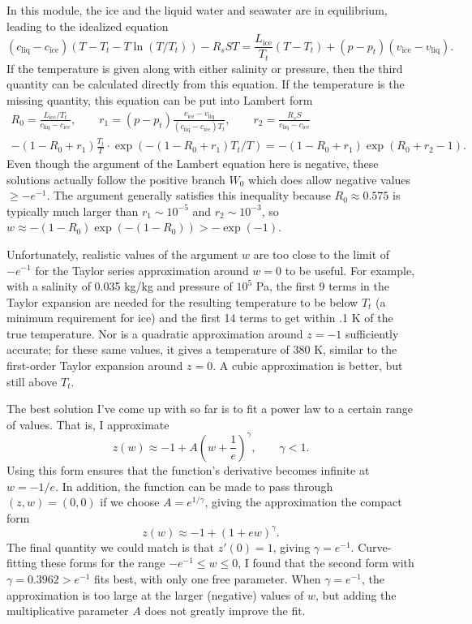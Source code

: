 \documentclass{article}
\newcommand{\liq}{\text{liq}}
\newcommand{\ice}{\text{ice}}
\begin{document}
In this module, the ice and the liquid water and seawater are in equilibrium, leading to the idealized equation
\begin{equation*}
    (c_{\liq}-c_{\ice}) (T - T_t - T \ln(T/T_t)) - R_s S T = \frac{L_{\ice}}{T_t} (T - T_t) + (p - p_t) (v_{\ice} - v_{\liq}).
\end{equation*}
If the temperature is given along with either salinity or pressure, then the third quantity can be calculated directly from this equation. If the temperature is the missing quantity, this equation can be put into Lambert form
\begin{gather*}
    R_0 = \frac{L_{\ice}/T_t}{c_{\liq}-c_{\ice}}, \qquad r_1 = (p - p_t) \frac{v_{\ice}-v_{\liq}}{(c_{\liq}-c_{\ice}) T_t}, \qquad r_2 = \frac{R_s S}{c_{\liq}-c_{\ice}} \\
    -(1 - R_0 + r_1) \frac{T_t}{T} \cdot \exp(-(1 - R_0 + r_1) T_t/T) = -(1 - R_0 + r_1) \exp(R_0 + r_2 - 1).
\end{gather*}
Even though the argument of the Lambert equation here is negative, these solutions actually follow the positive branch $W_0$ which does allow negative values $\ge -e^{-1}$. The argument generally satisfies this inequality because $R_0 \approx 0.575$ is typically much larger than $r_1 \sim 10^{-5}$ and $r_2 \sim 10^{-3}$, so $w \approx -(1-R_0)\exp(-(1-R_0)) > -\exp(-1)$.

Unfortunately, realistic values of the argument $w$ are too close to the limit of $-e^{-1}$ for the Taylor series approximation around $w=0$ to be useful. For example, with a salinity of 0.035 kg/kg and pressure of $10^5$ Pa, the first 9 terms in the Taylor expansion are needed for the resulting temperature to be below $T_t$ (a minimum requirement for ice) and the first 14 terms to get within .1 K of the true temperature. Nor is a quadratic approximation around $z=-1$ sufficiently accurate; for these same values, it gives a temperature of 380 K, similar to the first-order Taylor expansion around $z=0$. A cubic approximation is better, but still above $T_t$.

The best solution I've come up with so far is to fit a power law to a certain range of values. That is, I approximate
\begin{equation*}
    z(w) \approx -1 + A \left( w + \frac{1}{e} \right)^{\gamma}, \qquad \gamma < 1.
\end{equation*}
Using this form ensures that the function's derivative becomes infinite at $w=-1/e$. In addition, the function can be made to pass through $(z,w) = (0,0)$ if we choose $A = e^{1/\gamma}$, giving the approximation the compact form
\begin{equation*}
    z(w) \approx -1 + (1 + e w)^{\gamma}.
\end{equation*}
The final quantity we could match is that $z'(0) = 1$, giving $\gamma = e^{-1}$. Curve-fitting these forms for the range $-e^{-1} \le w \le 0$, I found that the second form with $\gamma = 0.3962 > e^{-1}$ fits best, with only one free parameter. When $\gamma = e^{-1}$, the approximation is too large at the larger (negative) values of $w$, but adding the multiplicative parameter $A$ does not greatly improve the fit.
\end{document}
